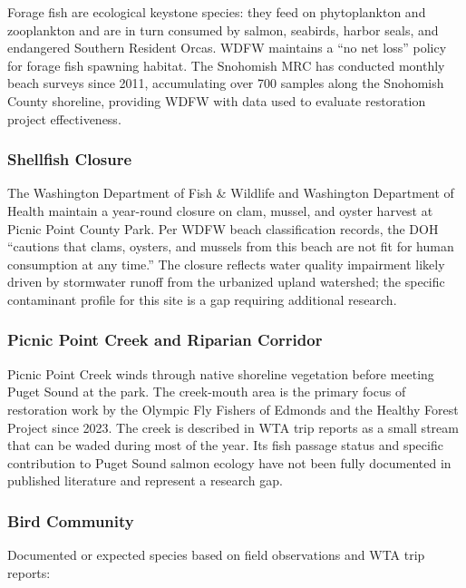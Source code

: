\documentclass[11pt,letterpaper]{article}
\begin{document}
Forage fish are ecological keystone species: they feed on phytoplankton and zooplankton and are in turn consumed by salmon, seabirds, harbor seals, and endangered Southern Resident Orcas. WDFW maintains a ``no net loss'' policy for forage fish spawning habitat. The Snohomish MRC has conducted monthly beach surveys since 2011, accumulating over 700 samples along the Snohomish County shoreline, providing WDFW with data used to evaluate restoration project effectiveness.

\subsubsection{Shellfish Closure}

The Washington Department of Fish \& Wildlife and Washington Department of Health maintain a year-round closure on clam, mussel, and oyster harvest at Picnic Point County Park. Per WDFW beach classification records, the DOH ``cautions that clams, oysters, and mussels from this beach are not fit for human consumption at any time.'' The closure reflects water quality impairment likely driven by stormwater runoff from the urbanized upland watershed; the specific contaminant profile for this site is a gap requiring additional research.

\subsubsection{Picnic Point Creek and Riparian Corridor}

Picnic Point Creek winds through native shoreline vegetation before meeting Puget Sound at the park. The creek-mouth area is the primary focus of restoration work by the Olympic Fly Fishers of Edmonds and the Healthy Forest Project since 2023. The creek is described in WTA trip reports as a small stream that can be waded during most of the year. Its fish passage status and specific contribution to Puget Sound salmon ecology have not been fully documented in published literature and represent a research gap.

\subsubsection{Bird Community}

Documented or expected species based on field observations and WTA trip reports:
\end{document}
